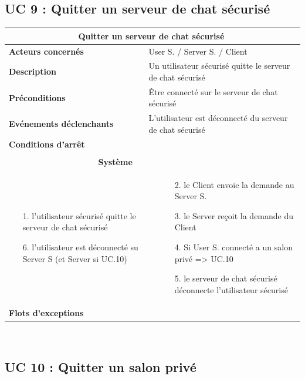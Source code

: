 \documentclass[a4paper,11pt,french]{article}
\newcommand{\fiche}[9] {
	\noindent
\begin{tabular}{|p{3.5cm}| p{1cm} | p{3cm} | p{.5cm} | p{7cm}|} 
\hline
\rowcolor{blue}
\multicolumn{2}{|l|}{\color{white}\bfseries{Nom}} & \multicolumn{3}{l|}{\color{white}\bfseries{#1}}\\
\hline
\multicolumn{2}{|l|}{\bfseries{Acteurs concernés}} & \multicolumn{3}{m{10.5cm}|}{#2}\\
\hline
\multicolumn{2}{|l|}{\bfseries{Description}} & \multicolumn{3}{m{10.5cm}|}{#3}\\
\hline
\multicolumn{2}{|l|}{\bfseries{Préconditions}} & \multicolumn{3}{m{10.5cm}|}{#4}\\
\hline
\multicolumn{2}{|l|}{\bfseries{Evénements déclenchants}} & \multicolumn{3}{m{10.5cm}|}{#5}\\
\hline
\multicolumn{2}{|l|}{\bfseries{Conditions d'arrêt}} & \multicolumn{3}{m{10.5cm}|}{#6}\\
\hline
\rowcolor{gray}
\multicolumn{5}{|c|}{\bfseries{Description du flot d'événements principal}}\\
\hline
\rowcolor{gray}
\multicolumn{3}{|c|}{\bfseries{Acteur(s)}} & \multicolumn{2}{c|}{\bfseries{Système}}\\
\hline
\multicolumn{3}{|p{7.5cm}|}{#7} & \multicolumn{2}{p{7.5cm}|}{#8}\\
\hline
\multicolumn{2}{|l}{\bfseries{Flots d'exceptions}} & \multicolumn{3}{|p{11.5cm}|}{#9}\\
\hline
\end{tabular}
\\
}
\begin{document}
\subsection{UC 9 : Quitter un serveur de chat sécurisé}

\fiche
	{Quitter un serveur de chat sécurisé} %
	{User S. / Server S. / Client} %
	{Un utilisateur sécurisé quitte le serveur de chat sécurisé} %
	{Être connecté sur le serveur de chat sécurisé} %
	{L’utilisateur est déconnecté du serveur de chat sécurisé} %
	{} %
	{\begin{itemize}  %
		\item [1.] l’utilisateur sécurisé quitte le serveur de chat sécurisé
		\item[]  
		\item[]  
		\item[]  
		\item[]  
		\item [6.] l’utilisateur est déconnecté su Server S (et Server si UC.10)
	 \end{itemize}
	} 
	{\begin{itemize}  %
		\item []
		\item [2.] le Client envoie la demande au Server S.
		\item [3.] le Server reçoit la demande du Client
		\item [4.] Si User S. connecté a un salon privé => UC.10
		\item [5.] le serveur de chat sécurisé déconnecte l’utilisateur sécurisé
	 \end{itemize}
	 }
	{} %

\subsection{UC 10 : Quitter un salon privé}
\end{document}
